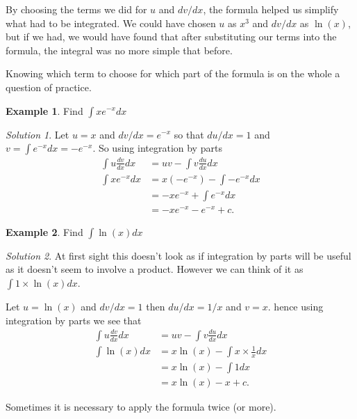\documentclass[
  11pt,
  oneside]{book}
\newcommand{\slide}{}
\theoremstyle{definition}
\theoremstyle{definition}
\newtheorem{example}{Example}[chapter]
\theoremstyle{definition}
\theoremstyle{definition}
\theoremstyle{remark}
\newtheorem*{solution}{Solution}
\begin{document}
\slide

By choosing the terms we did for \(u\) and \(dv/dx\), the formula helped us simplify what had to be integrated. We could have chosen \(u\) as \(x^3\) and \(dv/dx\) as \(\ln(x)\), but if we had, we would have found that after substituting our terms into the formula, the integral was no more simple that before.

Knowing which term to choose for which part of the formula is on the whole a question of practice.

\slide

\begin{example}
Find \(\displaystyle\int xe^{-x}dx\)
\end{example}

\begin{solution}
Let \(u = x\) and \(dv/dx=e^{-x}\) so that \(du/dx = 1\) and \(v=\displaystyle\int e^{-x}dx = -e^{-x}\). So using integration by parts
\begin{align*}
\int u\frac{dv}{dx}dx& = uv-\int v\frac{du}{dx}dx\\
\int xe^{-x}dx&=x(-e^{-x})-\int-e^{-x}dx\\
&=-xe^{-x}+\int e^{-x}dx\\
&=-xe^{-x}-e^{-x}+c.
\end{align*}
\end{solution}

\slide

\begin{example}
Find \(\displaystyle\int \ln(x)dx\)
\end{example}

\begin{solution}
At first sight this doesn't look as if integration by parts will be useful as it doesn't seem to involve a product. However we can think of it as \(\displaystyle\int 1\times\ln(x)dx\).

Let \(u = \ln(x)\) and \(dv/dx = 1\) then \(du/dx = 1/x\) and \(v = x\). hence using integration by parts we see that
\begin{align*}
\int u\frac{dv}{dx}dx& = uv-\int v\frac{du}{dx}dx\\
\int\ln(x)dx&=x\ln(x)-\int x\times\frac 1x dx\\
&=x\ln(x)-\int 1dx\\
&=x\ln(x)-x + c.
\end{align*}
\end{solution}

\slide

Sometimes it is necessary to apply the formula twice (or more).
\end{document}
